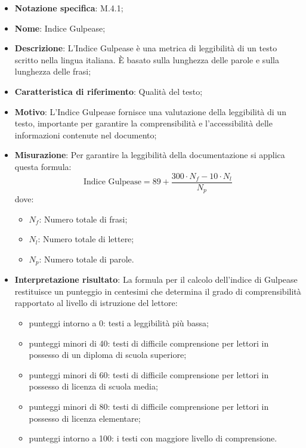 \begin{itemize}
    \item \textbf{Notazione specifica}: M.4.1;
    \item \textbf{Nome}: Indice Gulpease;
    \item \textbf{Descrizione}: L'Indice Gulpease è una metrica di leggibilità di un testo scritto nella lingua italiana. È basato sulla lunghezza delle parole e sulla lunghezza delle frasi;
    \item \textbf{Caratteristica di riferimento}: Qualità del testo;
    \item \textbf{Motivo}: L'Indice Gulpease fornisce una valutazione della leggibilità di un testo, importante per garantire la comprensibilità e l'accessibilità delle informazioni contenute nel documento;
    \item \textbf{Misurazione}: Per garantire la leggibilità della documentazione si applica questa formula:
    \[
        \text{Indice Gulpease} =89 + \frac{{300 \cdot {{N_f}} - 10 \cdot {{N_l}}}}{{{{N_p}}}}
    \]
    dove:
    \begin{itemize}
        \item $N_{f}$: Numero totale di frasi;
        \item $N_{l}$: Numero totale di lettere;
        \item $N_{p}$: Numero totale di parole.
        
    \end{itemize}
    \item \textbf{Interpretazione risultato}: La formula per il calcolo dell’indice di Gulpease restituisce un punteggio in centesimi che determina il grado di comprensibilità rapportato al livello di istruzione del lettore:
    \begin{itemize}
        \item punteggi intorno a 0: testi a leggibilità più bassa;
        \item punteggi minori di 40: testi di difficile comprensione per lettori in possesso di un diploma di scuola superiore;
        \item punteggi minori di 60: testi di difficile comprensione per lettori in possesso di licenza di scuola media;
        \item punteggi minori di 80: testi di difficile comprensione per lettori in possesso di licenza elementare;
        \item punteggi intorno a 100: i testi con maggiore livello di comprensione.
    \end{itemize}
\end{itemize}
